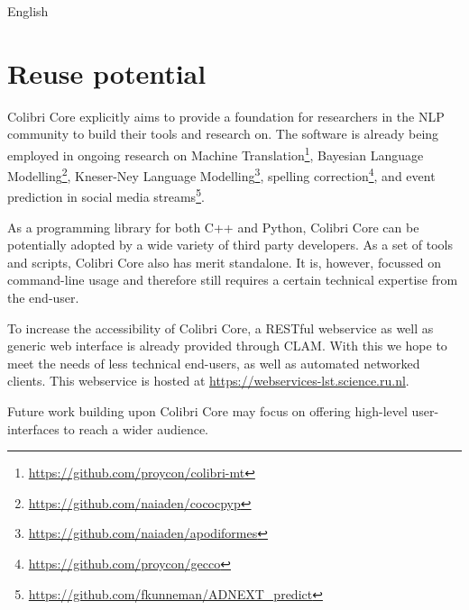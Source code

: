 \documentclass[a4paper,12pt]{article}
\begin{document}
English

\section{Reuse potential}

Colibri Core explicitly aims to provide a foundation for researchers in the NLP
community to build their tools and research on. The software is already being
employed in ongoing research on Machine
Translation\footnote{\url{https://github.com/proycon/colibri-mt}}, Bayesian Language
Modelling\footnote{\url{https://github.com/naiaden/cococpyp}}, Kneser-Ney Language
Modelling\footnote{\url{https://github.com/naiaden/apodiformes}}, spelling
correction\footnote{\url{https://github.com/proycon/gecco}}, and event
prediction in social media streams\footnote{\url{https://github.com/fkunneman/ADNEXT\_predict}}.

As a programming library for both C++ and Python, Colibri Core can be
potentially adopted by a wide variety of third party developers. As a set of
tools and scripts, Colibri Core also has merit standalone. It is, however,
focussed on command-line usage and therefore still requires a certain technical
expertise from the end-user.

To increase the accessibility of Colibri Core, a RESTful webservice as well as
generic web interface is already provided through CLAM\cite{CLAMPAPER}. With this we
hope to meet the needs of less technical end-users, as well as automated
networked clients. This webservice is hosted at
\url{https://webservices-lst.science.ru.nl}.

Future work building upon Colibri Core may focus on offering 
high-level user-interfaces to reach a wider audience.



\end{document}
